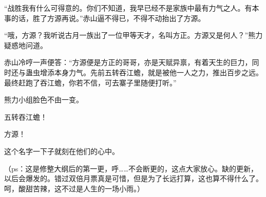 \begin{this_body}
“战胜我有什么可得意的。你们不知道，我早已经不是家族中最有力气之人。有本事的话，胜了方源再说。”赤山逼不得已，不得不动抬出了方源。

“哦，方源？我听说古月一族出了一位甲等天才，名叫方正。方源又是何人？”熊力疑惑地问道。

赤山冷哼一声便答：“方源便是方正的哥哥，亦是天赋异禀，有着天生的巨力，同时还与蛊虫增添本身力气。先前五转吞江蟾，就是被他一人之力，推出百步之远。最终赶跑了吞江蟾，你若不信，可去寨子里随便打听。”

熊力小组脸色不由一变。

五转吞江蟾！

方源！

这个名字一下子就刻在他们的心中。

（ps：这是修整大纲后的第一更，呼……不会断更的，这点大家放心。缺的更新，以后会爆发的。错过双倍月票真是可惜，但是为了长远打算，这也算不得什么了。呵，酸甜苦辣，这不过是人生的一场小雨。）

\end{this_body}

